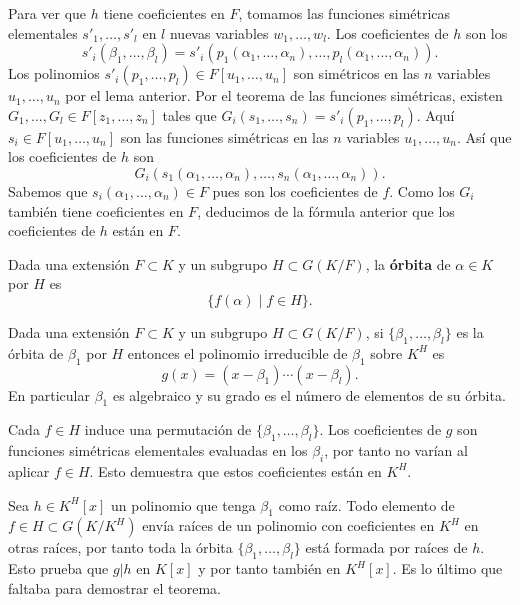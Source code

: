 Para ver que \(h\) tiene coeficientes en \(F\), tomamos las funciones
simétricas elementales \(s'_1,\dots, s'_l\) en \(l\) nuevas variables
\(w_1,\dots,w_l\). Los coeficientes de \(h\) son los
\[s'_i(\beta_1,\dots,\beta_l)=s'_i(p_1(\alpha_1,\dots,\alpha_n),\dots,p_l(\alpha_1,\dots,\alpha_n)).\]
Los polinomios \(s'_i(p_1,\dots,p_l)\in F[u_1,\dots,u_n]\) son
simétricos en las \(n\) variables \(u_1,\dots,u_n\) por el lema
anterior. Por el teorema de las funciones simétricas, existen
\(G_1,\dots, G_l\in F[z_1,\dots,z_n]\) tales que
\(G_i(s_1,\dots,s_n)=s'_i(p_1,\dots,p_l)\). Aquí
\(s_i\in F[u_1,\dots,u_n]\) son las funciones simétricas en las \(n\)
variables \(u_1,\dots,u_n\). Así que los coeficientes de \(h\) son \[
G_i(s_1(\alpha_1,\dots,\alpha_n),\dots,s_n(\alpha_1,\dots,\alpha_n)).
\] Sabemos que \(s_i(\alpha_1,\dots,\alpha_n)\in F\) pues son los
coeficientes de \(f\). Como los \(G_i\) también tiene coeficientes en
\(F\), deducimos de la fórmula anterior que los coeficientes de \(h\)
están en \(F\). 


Dada una extensión \(F\subset K\) y un subgrupo \(H\subset G(K/F)\), la
\textbf{órbita} de \(\alpha\in K\) por \(H\) es
\[\{f(\alpha)\mid f\in H\}.\] 


Dada una extensión \(F\subset K\) y un subgrupo \(H\subset G(K/F)\), si
\(\{\beta_1,\dots,\beta_l\}\) es la órbita de \(\beta_1\) por \(H\)
entonces el polinomio irreducible de \(\beta_1\) sobre \(K^H\) es
\[g(x)=(x-\beta_1)\cdots (x-\beta_l).\] En particular \(\beta_1\) es
algebraico y su grado es el número de elementos de su órbita.


Cada \(f\in H\) induce una permutación de
\(\{\beta_1,\dots,\beta_l\}\). Los coeficientes de \(g\) son
funciones simétricas elementales evaluadas en los \(\beta_i\), por
tanto no varían al aplicar \(f\in H\). Esto demuestra que estos
coeficientes están en \(K^H\).

Sea \(h\in K^H[x]\) un polinomio que tenga \(\beta_1\) como raíz. Todo
elemento de \(f\in H\subset G(K/K^H)\) envía raíces de un polinomio con
coeficientes en \(K^H\) en otras raíces, por tanto toda la órbita
\(\{\beta_1,\dots,\beta_l\}\) está formada por raíces de \(h\). Esto
prueba que \(g|h\) en \(K[x]\) y por tanto también en \(K^H[x]\). Es lo
último que faltaba para demostrar el teorema. 


